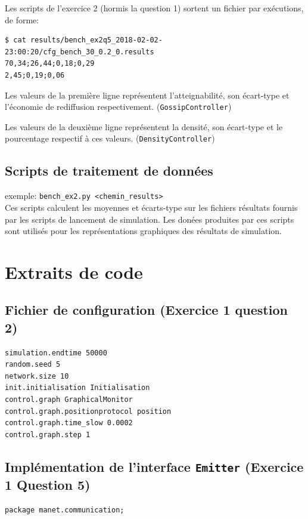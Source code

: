 \documentclass[a4paper]{article}
\begin{document}
\begin{appendix}
Les scripts de l'exercice 2 (hormis la question 1) sortent un fichier
par exécutions, de forme:

\begin{verbatim}
$ cat results/bench_ex2q5_2018-02-02-23:00:20/cfg_bench_30_0.2_0.results
70,34;26,44;0,18;0,29
2,45;0,19;0,06
\end{verbatim}




Les valeurs de la première ligne représentent l'atteignabilité, son
écart-type et l'économie de rediffusion
respectivement. (\texttt{GossipController})


Les valeurs de la deuxième ligne représentent la densité, son
écart-type et le pourcentage respectif à ces valeurs. (\texttt{DensityController})

\subsection{Scripts de traitement de données}
exemple: \texttt{bench\_ex2.py <chemin\_results>}\\
Ces scripts calculent les moyennes et écarts-type sur les fichiers
résultats fournis par les scripts de lancement de simulation. Les
donées produites par ces scripts sont utilisés pour les
représentations graphiques des résultats de simulation.


\section{Extraits de code}


\subsection{Fichier de configuration (Exercice 1 question 2)}

\begin{verbatim}
simulation.endtime 50000
random.seed 5
network.size 10
init.initialisation Initialisation
control.graph GraphicalMonitor
control.graph.positionprotocol position
control.graph.time_slow 0.0002
control.graph.step 1
\end{verbatim}



\subsection{Implémentation de l'interface \texttt{Emitter} (Exercice 1
  Question 5)}
\begin{lstlisting}
package manet.communication;


\end{lstlisting}
\end{appendix}
\end{document}
